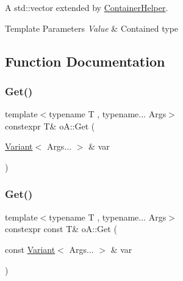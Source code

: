 A std\+::vector extended by \mbox{\hyperlink{classo_a_1_1_container_helper}{Container\+Helper}}. 


\begin{DoxyTemplParams}{Template Parameters}
{\em Value} & Contained type \\
\hline
\end{DoxyTemplParams}


\subsection{Function Documentation}
\mbox{\label{namespaceo_a_ad005adf81258b6620b273f6b58be4a42}} 
\subsubsection{\texorpdfstring{Get()}{Get()}\hspace{0.1cm}{\footnotesize\ttfamily [1/2]}}
{\footnotesize\ttfamily template$<$typename T , typename... Args$>$ \\
constexpr T\& o\+A\+::\+Get (\begin{DoxyParamCaption}\item[{\mbox{\hyperlink{namespaceo_a_a46a1498e4e673b19327a24fac0018867}{Variant}}$<$ Args... $>$ \&}]{var }\end{DoxyParamCaption})\hspace{0.3cm}{\ttfamily [inline]}}

\mbox{\label{namespaceo_a_a1d74fafe5226bbc3bc4bcb41f6f24113}} 
\subsubsection{\texorpdfstring{Get()}{Get()}\hspace{0.1cm}{\footnotesize\ttfamily [2/2]}}
{\footnotesize\ttfamily template$<$typename T , typename... Args$>$ \\
constexpr const T\& o\+A\+::\+Get (\begin{DoxyParamCaption}\item[{const \mbox{\hyperlink{namespaceo_a_a46a1498e4e673b19327a24fac0018867}{Variant}}$<$ Args... $>$ \&}]{var }\end{DoxyParamCaption})\hspace{0.3cm}{\ttfamily [inline]}}

